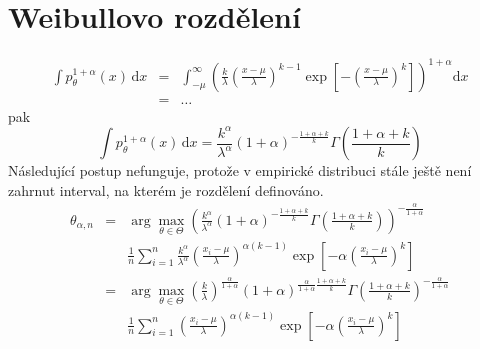 \documentclass[11pt, a4paper]{article}
\newcommand{\intpa}{\int p_\theta^{1+\alpha}(x) \, \mathrm{d}x }
\newcommand{\amtiT}{\arg \max_{\theta \in \Theta}}
\newcommand{\fa}{\frac{\alpha}{1+\alpha}}
\begin{document}
\section{Weibullovo rozdělení} %

\begin{eqnarray}
\intpa & = & \int_{-\mu }^{\infty } \left( \frac{k}{\lambda} \left( \frac{x-\mu}{\lambda} \right)^{k-1} \exp \left[ -\left( \frac{x-\mu}{\lambda} \right)^k \right] \right)^{1+\alpha} \mathrm{d}x \nonumber\\
& = & \ldots \nonumber
\end{eqnarray} 
pak
\begin{equation}
\intpa = \frac{k^\alpha}{\lambda^\alpha}(1+\alpha)^{-\frac{1+\alpha +k}{k}} \Gamma \left( \frac{1+\alpha +k}{k}\right)
\end{equation}
Následující postup nefunguje, protože v empirické distribuci stále ještě není zahrnut interval, na kterém je rozdělení definováno.
\begin{eqnarray}
\theta_{\alpha,n} & = & \amtiT \left(\frac{k^\alpha}{\lambda^\alpha}(1+\alpha)^{-\frac{1+\alpha+k}{k}} \Gamma \left(\frac{1+\alpha+k}{k}\right) \right)^{-\fa} \nonumber \\
&&  \frac{1}{n} \sum_{i=1}^n \frac{k^\alpha}{\lambda^\alpha} \left( \frac{x_i-\mu}{\lambda}\right)^{\alpha(k-1)} \exp \left[-\alpha \left(\frac{x_i-\mu}{\lambda}\right)^k \right] \nonumber \\
& = & \amtiT \left( \frac{k}{\lambda} \right)^\fa (1+\alpha)^{\fa\frac{1+\alpha+k}{k}} \Gamma\left(\frac{1+\alpha+k}{k}\right)^{-\fa} \nonumber\\
&& \frac{1}{n}\sum_{i=1}^n \left( \frac{x_i-\mu}{\lambda}\right)^{\alpha(k-1)} \exp\left[-\alpha \left(\frac{x_i-\mu}{\lambda}\right)^k\right]
\end{eqnarray}
\end{document}
